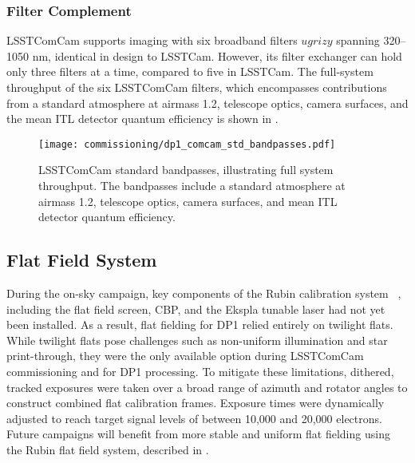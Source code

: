 \subsubsection{Filter Complement}
\label{sssec:comcam_filters}
\gls{LSSTComCam} supports imaging with six broadband filters $ugrizy$ spanning 320–1050 nm, identical in design to \gls{LSSTCam}.
However, its filter exchanger can hold only three filters at a time, compared to five in \gls{LSSTCam}.
The full-system throughput of the six \gls{LSSTComCam} filters, which encompasses contributions from a standard atmosphere at airmass 1.2, telescope optics, camera surfaces, and the mean \gls{ITL} detector quantum efficiency is shown in .
\begin{figure}[htb!]
\centering
\texttt{[image: commissioning/dp1\_comcam\_std\_bandpasses.pdf]}
\caption{LSSTComCam standard bandpasses, illustrating full system throughput. The bandpasses include a standard atmosphere at airmass 1.2, telescope optics, camera surfaces, and mean \gls{ITL} detector quantum efficiency.}
\label{fig:comcam_standard_bandpasses}
\vspace{0.1cm}
\end{figure}

\subsection{Flat Field System
\label{ssec:flat_field_system}}
During the on-sky campaign, key components of the Rubin calibration system ~\citep{2022SPIE12182E..0RI}, including the flat field screen, \gls{CBP}, and the Ekspla tunable laser had not yet been installed.
As a result, flat fielding for \gls{DP1} relied entirely on twilight flats.
While twilight flats pose challenges such as non-uniform illumination and star print-through, they were the only available option during \gls{LSSTComCam} commissioning and for DP1 processing.
To mitigate these limitations, dithered, tracked exposures were taken over a broad range of azimuth and rotator angles to construct combined flat \gls{calibration} frames.
Exposure times were dynamically adjusted to reach target signal levels of between 10,000 and 20,000 electrons.
Future campaigns will benefit from more stable and uniform flat fielding using the Rubin flat field system, described in \citet{SITCOMTN-086}.

